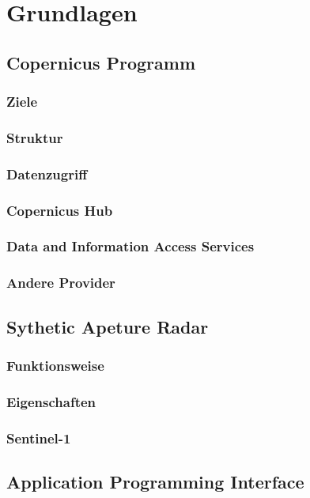 \newpage
\restoregeometry
\section{Grundlagen}
\subsection{Copernicus Programm}
\subsubsection{Ziele}
\subsubsection{Struktur}
\subsubsection{Datenzugriff}
\subsubsection{Copernicus Hub}
\subsubsection{Data and Information Access Services}
\subsubsection{Andere Provider}

\subsection{Sythetic Apeture Radar}
\subsubsection{Funktionsweise}
\subsubsection{Eigenschaften}
\subsubsection{Sentinel-1}

\subsection{Application Programming Interface}
